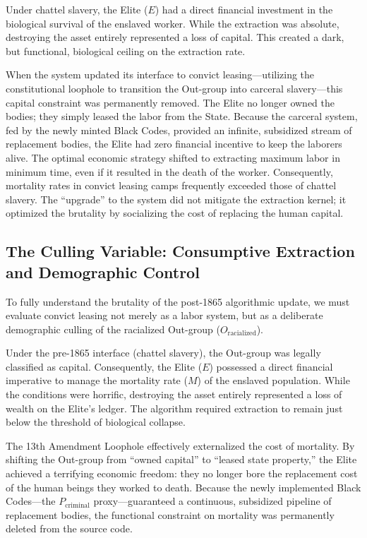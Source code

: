 \documentclass[12pt,openany]{book}
\begin{document}
Under chattel slavery, the Elite ($E$) had a direct financial investment in the biological survival of the enslaved worker. While the extraction was absolute, destroying the asset entirely represented a loss of capital. This created a dark, but functional, biological ceiling on the extraction rate.

When the system updated its interface to convict leasing---utilizing the constitutional loophole to transition the Out-group into carceral slavery---this capital constraint was permanently removed. The Elite no longer owned the bodies; they simply leased the labor from the State. Because the carceral system, fed by the newly minted Black Codes, provided an infinite, subsidized stream of replacement bodies, the Elite had zero financial incentive to keep the laborers alive. The optimal economic strategy shifted to extracting maximum labor in minimum time, even if it resulted in the death of the worker. Consequently, mortality rates in convict leasing camps frequently exceeded those of chattel slavery. The ``upgrade'' to the system did not mitigate the extraction kernel; it optimized the brutality by socializing the cost of replacing the human capital.

\subsection{The Culling Variable: Consumptive Extraction and Demographic Control}

To fully understand the brutality of the post-1865 algorithmic update, we must evaluate convict leasing not merely as a labor system, but as a deliberate demographic culling of the racialized Out-group ($O_{\text{racialized}}$).

Under the pre-1865 interface (chattel slavery), the Out-group was legally classified as capital. Consequently, the Elite ($E$) possessed a direct financial imperative to manage the mortality rate ($M$) of the enslaved population. While the conditions were horrific, destroying the asset entirely represented a loss of wealth on the Elite's ledger. The algorithm required extraction to remain just below the threshold of biological collapse.

The 13th Amendment Loophole effectively externalized the cost of mortality. By shifting the Out-group from ``owned capital'' to ``leased state property,'' the Elite achieved a terrifying economic freedom: they no longer bore the replacement cost of the human beings they worked to death. Because the newly implemented Black Codes---the $P_{\text{criminal}}$ proxy---guaranteed a continuous, subsidized pipeline of replacement bodies, the functional constraint on mortality was permanently deleted from the source code.
\end{document}
